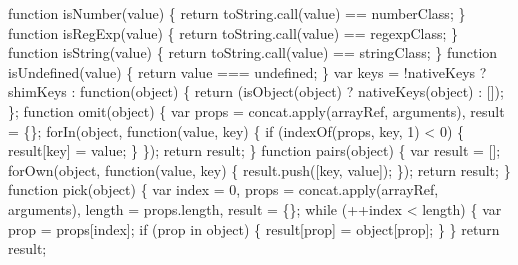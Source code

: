 \begin{DoxyCodeInclude}
{{\textcolor{stringliteral}{}
\textcolor{stringliteral}{  function isNumber(value) \{}
\textcolor{stringliteral}{    return toString.call(value) == numberClass;}
\textcolor{stringliteral}{  \}}
\textcolor{stringliteral}{}
\textcolor{stringliteral}{  function isRegExp(value) \{}
\textcolor{stringliteral}{    return toString.call(value) == regexpClass;}
\textcolor{stringliteral}{  \}}
\textcolor{stringliteral}{}
\textcolor{stringliteral}{  function isString(value) \{}
\textcolor{stringliteral}{    return toString.call(value) == stringClass;}
\textcolor{stringliteral}{  \}}
\textcolor{stringliteral}{}
\textcolor{stringliteral}{  function isUndefined(value) \{}
\textcolor{stringliteral}{    return value === undefined;}
\textcolor{stringliteral}{  \}}
\textcolor{stringliteral}{}
\textcolor{stringliteral}{  var keys = !nativeKeys ? shimKeys : function(object) \{}
\textcolor{stringliteral}{    return (isObject(object) ? nativeKeys(object) : []);}
\textcolor{stringliteral}{  \};}
\textcolor{stringliteral}{}
\textcolor{stringliteral}{  function omit(object) \{}
\textcolor{stringliteral}{    var props = concat.apply(arrayRef, arguments),}
\textcolor{stringliteral}{        result = \{\};}
\textcolor{stringliteral}{}
\textcolor{stringliteral}{    forIn(object, function(value, key) \{}
\textcolor{stringliteral}{      if (indexOf(props, key, 1) < 0) \{}
\textcolor{stringliteral}{        result[key] = value;}
\textcolor{stringliteral}{      \}}
\textcolor{stringliteral}{    \});}
\textcolor{stringliteral}{    return result;}
\textcolor{stringliteral}{  \}}
\textcolor{stringliteral}{}
\textcolor{stringliteral}{  function pairs(object) \{}
\textcolor{stringliteral}{    var result = [];}
\textcolor{stringliteral}{    forOwn(object, function(value, key) \{}
\textcolor{stringliteral}{      result.push([key, value]);}
\textcolor{stringliteral}{    \});}
\textcolor{stringliteral}{    return result;}
\textcolor{stringliteral}{  \}}
\textcolor{stringliteral}{}
\textcolor{stringliteral}{  function pick(object) \{}
\textcolor{stringliteral}{    var index = 0,}
\textcolor{stringliteral}{        props = concat.apply(arrayRef, arguments),}
\textcolor{stringliteral}{        length = props.length,}
\textcolor{stringliteral}{        result = \{\};}
\textcolor{stringliteral}{}
\textcolor{stringliteral}{    while (++index < length) \{}
\textcolor{stringliteral}{      var prop = props[index];}
\textcolor{stringliteral}{      if (prop in object) \{}
\textcolor{stringliteral}{        result[prop] = object[prop];}
\textcolor{stringliteral}{      \}}
\textcolor{stringliteral}{    \}}
\textcolor{stringliteral}{    return result;}
}}
\end{DoxyCodeInclude}
